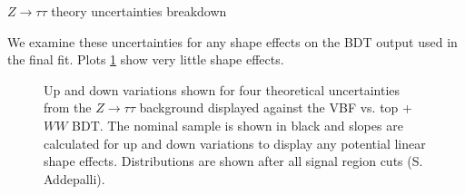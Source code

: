 \begin{table}[h!]
\scalebox{0.6}{

}
\caption{$Z\rightarrow\tau\tau$ theory uncertainties breakdown}
\label{tab:ztttheory}
\end{table}

We examine these uncertainties for any shape effects on the BDT output used in the final fit. Plots \ref{fig:ztttheor} show very little shape effects.

\begin{figure}[!h]
  \hfill
  \hfill
  \hfill
  \hfill
{\caption{Up and down variations shown for four theoretical uncertainties from the $Z\rightarrow\tau\tau$ background displayed against the VBF vs. top +$WW$ BDT. The nominal sample is shown in black and slopes are calculated for up and down variations to display any potential linear shape effects. Distributions are shown after all signal region cuts (S. Addepalli).
\label{fig:ztttheor}}}
\end{figure}
